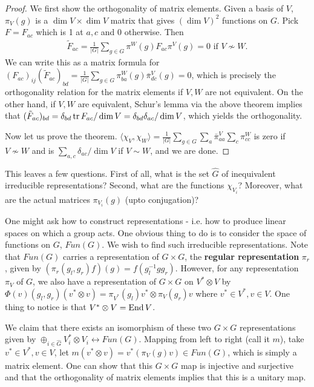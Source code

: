 \documentclass{../mathnotes}
\begin{document}
\begin{proof}
    We first show the orthogonality of matrix elements. Given a basis of $V$, $\pi_V(g)$ is a $\dim V\times \dim V$ matrix that
    gives $(\dim V)^2$ functions on $G$. Pick $F=F_{ac}$ which is 1 at $a,c$ and 0 otherwise. Then
    \begin{align*}
        \tilde F_{ac}=\frac{1}{|G|}\sum_{g\in G}\pi^W(g)F_{ac}\pi^V(g)=0\text{ if }V\nsim W.
    \end{align*}
    We can write this as a matrix formula for $(F_{ac})_{ij}(\tilde F_{ac})_{bd}=\frac{1}{|G|}\sum_{g\in G}\pi^W_{ba}(g)\bar{\pi}^V_{dc}(g)=0$,
    which is precisely the orthogonality relation for the matrix elements if $V,W$ are not equivalent. On the other hand, if $V,W$ are equivalent,
    Schur's lemma via the above theorem implies that $(\tilde F_{ac})_{bd}=\delta_{bd}\operatorname{tr} F_{ac}/\dim V=\delta_{bd}\delta_{ac}/\dim V$, which yields 
    the orthogonality.

    Now let us prove the theorem. $\langle\chi_V,\chi_W\rangle=\frac{1}{|G|}\sum_{g\in G}\sum_a\bar\pi_{aa}^V\sum_c\pi^W_{cc}$ is zero if $V\nsim W$
    and is $\sum_{a,c}\delta_{ac}/\dim V$ if $V\sim W$, and we are done.
\end{proof}

This leaves a few questions. First of all, what is the set $\hat G$ of inequivalent irreducible representations? Second, what are the functions $\chi_{V_i}$?
Moreover, what are the actual matrices $\pi_{V_i}(g)$ (upto conjugation)?


One might ask how to construct representations - i.e. how to produce linear spaces on which a group acts. One obvious thing to do is to consider the space
of functions on $G$, $Fun(G)$. We wish to find such irreducible representations. Note that $Fun(G)$ carries a representation of $G\times G$, the \textbf{regular
representation} $\pi_r$, given by $(\pi_r(g_l,g_r)f)(g)=f(g_l^{-1}gg_r).$ However, for any representation $\pi_V$ of $G$, we also have a representation of $G\times G$
on $V^*\otimes V$ by $\Phi(v)(g_l,g_r)(v^*\otimes v)=\pi_{V^*}(g_l)v^*\otimes \pi_V(g_r)v$ where $v^*\in V^*,v\in V$.
One thing to notice is that $V^*\otimes V=\operatorname{End} V$.

We claim that there exists an isomorphism of these two $G\times G$ representations given by $\oplus_{i\in\hat G}V_i^*\otimes V_i\leftrightarrow Fun(G)$.
Mapping from left to right (call it $m$), take $v^*\in V^*,v\in V$, let $m(v^*\otimes v)=v^*(\pi_V(g)v)\in Fun(G)$, which is simply a matrix element.
One can show that this $G\times G$ map is injective and surjective and that the orthogonality of matrix elements implies that this is a unitary map.
\end{document}
